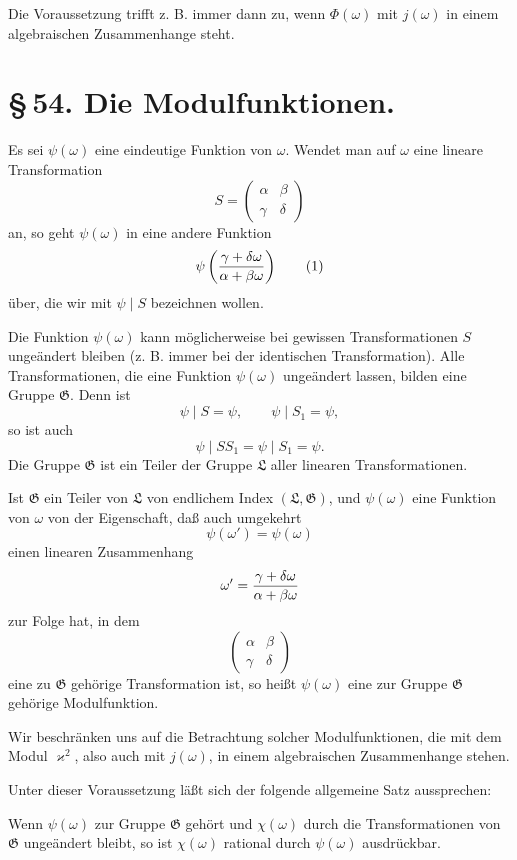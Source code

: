 \documentclass[11pt]{article}
\begin{document}
Die Voraussetzung trifft z. B. immer dann zu, wenn $\Phi(\omega)$ mit $j(\omega)$ in einem algebraischen Zusammenhange steht.

\section*{\S\,54. Die Modulfunktionen.}

Es sei $\psi(\omega)$ eine eindeutige Funktion von $\omega$. Wendet man auf $\omega$ eine lineare Transformation
\[
S=\begin{pmatrix}\alpha&\beta\\ \gamma&\delta\end{pmatrix}
\]
an, so geht $\psi(\omega)$ in eine andere Funktion
\begin{equation}
\psi\left({\gamma+\delta\omega\over\alpha+\beta\omega}\right)
\tag{1}
\end{equation}
über, die wir mit $\psi\mid S$ bezeichnen wollen.

Die Funktion $\psi(\omega)$ kann möglicherweise bei gewissen Transformationen $S$ ungeändert bleiben (z. B. immer bei der identischen Transformation). Alle Transformationen, die eine Funktion $\psi(\omega)$ ungeändert lassen, bilden eine Gruppe $\mathfrak G$. Denn ist
\[
\psi\mid S=\psi,
\qquad
\psi\mid S_1=\psi,
\]
so ist auch
\[
\psi\mid SS_1=\psi\mid S_1=\psi.
\]
Die Gruppe $\mathfrak G$ ist ein Teiler der Gruppe $\mathfrak L$ aller linearen Transformationen.

Ist $\mathfrak G$ ein Teiler von $\mathfrak L$ von endlichem Index $(\mathfrak L,\mathfrak G)$, und $\psi(\omega)$ eine Funktion von $\omega$ von der Eigenschaft, daß auch umgekehrt
\[
\psi(\omega')=\psi(\omega)
\]
einen linearen Zusammenhang
\[
\omega'={\gamma+\delta\omega\over\alpha+\beta\omega}
\]
zur Folge hat, in dem
\[
\begin{pmatrix}\alpha&\beta\\ \gamma&\delta\end{pmatrix}
\]
eine zu $\mathfrak G$ gehörige Transformation ist, so heißt $\psi(\omega)$ eine zur Gruppe $\mathfrak G$ gehörige Modulfunktion.

Wir beschränken uns auf die Betrachtung solcher Modulfunktionen, die mit dem Modul $\varkappa^2$, also auch mit $j(\omega)$, in einem algebraischen Zusammenhange stehen.

Unter dieser Voraussetzung läßt sich der folgende allgemeine Satz aussprechen:

Wenn $\psi(\omega)$ zur Gruppe $\mathfrak G$ gehört und $\chi(\omega)$ durch die Transformationen von $\mathfrak G$ ungeändert bleibt, so ist $\chi(\omega)$ rational durch $\psi(\omega)$ ausdrückbar.
\end{document}
